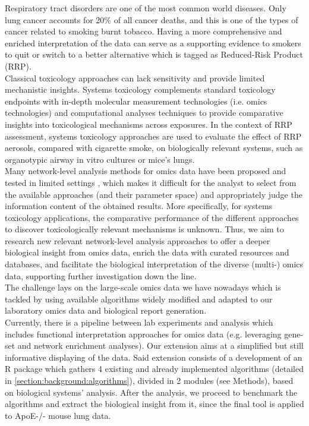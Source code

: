 Respiratory tract disorders are one of the most common world diseases. Only lung cancer accounts for 20\% of all cancer deaths, and this is one of the types of cancer related to smoking burnt tobacco. Having a more comprehensive and enriched interpretation of the data can serve as a supporting evidence to smokers to quit or switch to a better alternative which is tagged as Reduced-Risk Product (RRP). 
\\

Classical toxicology  approaches can lack sensitivity and provide limited mechanistic insights. Systems toxicology \cite{Sturla2014SystemsAssessment} complements standard toxicology endpoints with in-depth molecular measurement technologies (i.e. omics technologies) and computational analyses techniques to provide comparative insights into toxicological mechanisms across exposures. In the context of RRP assessment, systems toxicology approaches are used to evaluate the effect of RRP aerosols, compared with cigarette smoke, on biologically relevant systems, such as organotypic airway in vitro cultures or mice’s lungs.
\\

Many network-level analysis methods for omics data have been proposed and tested in limited settings \cite{Gwinner2017Network-basedMethod} \cite{Yan2017NetworkData} \cite{Dimitrakopoulos2018Network-basedGenes}, which makes it difficult for the analyst to select from the available approaches (and their parameter space) and appropriately judge the information content of the obtained results. More specifically, for systems toxicology applications, the comparative performance of the different approaches to discover toxicologically relevant mechanisms is unknown. Thus, we aim to research new relevant network-level analysis approaches to offer a deeper biological insight from omics data, enrich the data with curated resources and databases, and facilitate the biological interpretation of the diverse (multi-) omics data, supporting further investigation down the line.
\\

The challenge lays on the large-scale omics data we have nowadays which is tackled by using available algorithms widely modified and adapted to our laboratory omics data and biological report generation. 
\\

Currently, there is a pipeline between lab experiments and analysis which includes functional interpretation approaches for omics data (e.g. leveraging gene-set and network enrichment analyses). Our extension aims at a simplified but still informative displaying of the data. Said extension consists of a development of an R package which gathers 4 existing and already implemented algorithms (detailed in \ref{section:background:algorithms}), divided in 2 modules (see Methods), based on biological systems’ analysis. After the analysis, we proceed to benchmark the algorithms and extract the biological insight from it, since the final tool is applied to ApoE-/- mouse lung data.

